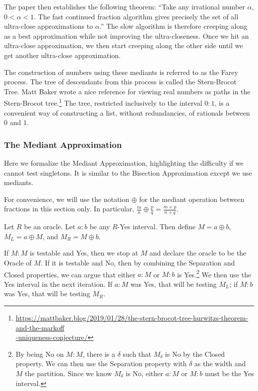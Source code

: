 \documentclass[12pt]{article}
\begin{document}
The paper then establishes the following theorem: ``Take any irrational number $\alpha$, $0 < \alpha < 1$. The fast continued fraction algorithm gives precisely the set of all ultra-close approximations to $\alpha$.''  The slow algorithm is therefore creeping along as a best approximation while not improving the ultra-closeness. Once we hit an ultra-close approximation, we then start creeping along the other side until we get another ultra-close approximation. 

The construction of numbers using these mediants is referred to as the Farey process. The tree of descendants from this process is called the Stern-Brocot Tree. Matt Baker wrote a nice reference for viewing real numbers as paths in the Stern-Brocot tree.\footnote{{\href{https://mattbaker.blog/2019/01/28/the-stern-brocot-tree-hurwitzs-theorem-and-the-markoff-uniqueness-conjecture/}{https://mattbaker.blog/2019/01/28/the-stern-brocot-tree-hurwitzs-theorem-and-the-markoff} \\ \hspace*{10px}  \href{https://mattbaker.blog/2019/01/28/the-stern-brocot-tree-hurwitzs-theorem-and-the-markoff-uniqueness-conjecture/}{-uniqueness-conjecture/} }} The tree, restricted inclusively to the interval $0:1$, is a convenient way of constructing a list, without redundancies, of rationals between $0$ and $1$. 

\subsubsection{The Mediant Approximation}

Here we formalize the Mediant Approximation, highlighting the difficulty if we cannot test singletons.  It is similar to the Bisection Approximation except we use mediants. 

For convenience, we will use the notation $\oplus$ for the mediant operation between fractions in this section only. In particular, $\frac{m}{n} \oplus \frac{p}{q} = \frac{m+p}{n+q}$. 

Let $R$ be an oracle. Let $a:b$ be any $R$-Yes interval. Then define $M = a\oplus b$, $M_L = a \oplus M$, and $M_R = M \oplus b$. 

If $M:M$ is testable and Yes, then we stop at $M$ and declare the oracle to be the Oracle of $M$. If it is testable and No, then by combining the Separation and Closed properties, we can argue that either $a:M$ or $M:b$ is Yes.\footnote{By being No on $M:M$, there is a $\delta$ such that $M_\delta$ is No by the Closed property. We can then use the Separation property with $\delta$ as the width and $M$ the partition. Since we know $M_\delta$ is No, either $a:M$ or $M:b$ must be the Yes interval.} We then use the Yes interval in the next iteration. If $a:M$ was Yes, that will be testing $M_L$; if $M:b$ was Yes, that will be testing $M_R$.
\end{document}
